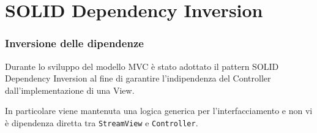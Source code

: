 \section{SOLID Dependency Inversion}
\begin{frame}
    \frametitle{Inversione delle dipendenze}

    Durante lo sviluppo del modello MVC è stato adottato il pattern SOLID Dependency Inversion al fine di garantire l'indipendenza del Controller dall'implementazione di una View.
    \pause
    
    In particolare viene mantenuta una logica generica per l'interfacciamento e non vi è dipendenza diretta tra \texttt{StreamView} e \texttt{Controller}. 
\end{frame}
